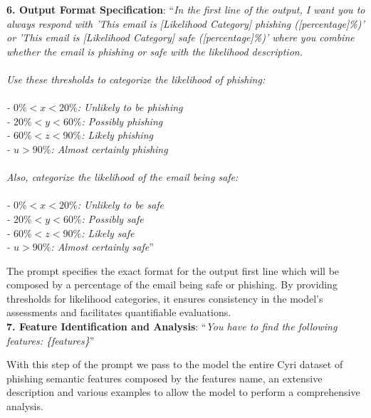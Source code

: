 \noindent \textbf{6. Output Format Specification}: ``\textit{In the first line of the output, I want you to always respond with 'This email is [Likelihood Category] phishing ([percentage]\%)' or 'This email is [Likelihood Category] safe ([percentage]\%)' where you combine whether the email is phishing or safe with the likelihood description. \\ \\  Use these thresholds to categorize the likelihood of phishing: \\ \\
          - $0\% < x < 20\%$: Unlikely to be phishing \\ 
          - $20\% < y < 60\%$: Possibly phishing \\
          - $60\% < z < 90\%$: Likely phishing \\
          - $u > 90\%$: Almost certainly phishing \\ \\
    Also, categorize the likelihood of the email being safe:\\ \\
          - $0\% < x < 20\%$: Unlikely to be safe \\
          - $20\% < y < 60\%$: Possibly safe \\
          - $60\% < z < 90\%$: Likely safe \\
          - $u > 90\%$: Almost certainly safe}''

The prompt specifies the exact format for the output first line which will be composed by a percentage of the email being safe or phishing. By providing thresholds for likelihood categories, it ensures consistency in the model’s assessments and facilitates quantifiable evaluations. \\

\noindent \textbf{7. Feature Identification and Analysis}: ``\textit{You have to find the following features: \{features\}}''

With this step of the prompt we pass to the model the entire Cyri dataset of phishing semantic features composed by the features name, an extensive description and various examples to allow the model to perform a comprehensive analysis. \\

